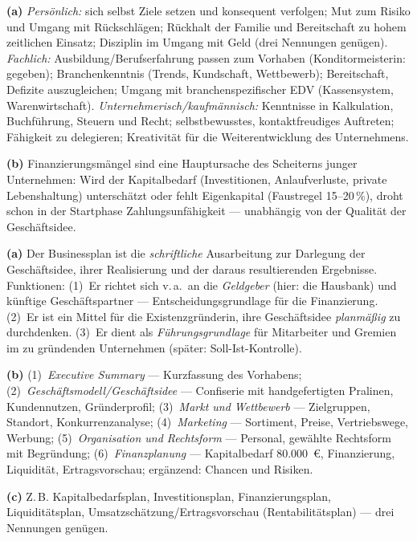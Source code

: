 \documentclass[11pt, a4paper]{article}
\begin{document}
\begin{loesung}[title={Lösung Aufgabe~2 --- Voraussetzungen}]
\textbf{(a)} \emph{Persönlich:} sich selbst Ziele setzen und konsequent verfolgen; Mut
zum Risiko und Umgang mit Rückschlägen; Rückhalt der Familie und Bereitschaft zu hohem
zeitlichen Einsatz; Disziplin im Umgang mit Geld (drei Nennungen genügen).
\emph{Fachlich:} Ausbildung/Berufserfahrung passen zum Vorhaben (Konditormeisterin:
gegeben); Branchenkenntnis (Trends, Kundschaft, Wettbewerb); Bereitschaft, Defizite
auszugleichen; Umgang mit branchenspezifischer EDV (Kassensystem, Warenwirtschaft).
\emph{Unternehmerisch/kaufmännisch:} Kenntnisse in Kalkulation, Buchführung, Steuern und
Recht; selbstbewusstes, kontaktfreudiges Auftreten; Fähigkeit zu delegieren; Kreativität
für die Weiterentwicklung des Unternehmens.

\textbf{(b)} Finanzierungsmängel sind eine Hauptursache des Scheiterns junger
Unternehmen: Wird der Kapitalbedarf (Investitionen, Anlaufverluste, private
Lebenshaltung) unterschätzt oder fehlt Eigenkapital (Faustregel 15--20\,\%), droht schon
in der Startphase Zahlungsunfähigkeit --- unabhängig von der Qualität der Geschäftsidee.
\end{loesung}

\begin{loesung}[title={Lösung Aufgabe~3 --- Businessplan}]
\textbf{(a)} Der Businessplan ist die \emph{schriftliche} Ausarbeitung zur Darlegung der
Geschäftsidee, ihrer Realisierung und der daraus resultierenden Ergebnisse. Funktionen:
(1)~Er richtet sich v.\,a.\ an die \emph{Geldgeber} (hier: die Hausbank) und künftige
Geschäftspartner --- Entscheidungsgrundlage für die Finanzierung. (2)~Er ist ein Mittel
für die Existenzgründerin, ihre Geschäftsidee \emph{planmäßig} zu durchdenken.
(3)~Er dient als \emph{Führungsgrundlage} für Mitarbeiter und Gremien im zu gründenden
Unternehmen (später: Soll-Ist-Kontrolle).

\textbf{(b)} (1)~\emph{Executive Summary} --- Kurzfassung des Vorhabens;
(2)~\emph{Geschäftsmodell/Geschäftsidee} --- Confiserie mit handgefertigten Pralinen,
Kundennutzen, Gründerprofil; (3)~\emph{Markt und Wettbewerb} --- Zielgruppen, Standort,
Konkurrenzanalyse; (4)~\emph{Marketing} --- Sortiment, Preise, Vertriebswege, Werbung;
(5)~\emph{Organisation und Rechtsform} --- Personal, gewählte Rechtsform mit Begründung;
(6)~\emph{Finanzplanung} --- Kapitalbedarf 80.000~€, Finanzierung, Liquidität,
Ertragsvorschau; ergänzend: Chancen und Risiken.

\textbf{(c)} Z.\,B. Kapitalbedarfsplan, Investitionsplan, Finanzierungsplan,
Liquiditätsplan, Umsatzschätzung/Ertragsvorschau (Rentabilitätsplan) --- drei Nennungen
genügen.
\end{loesung}
\end{document}
